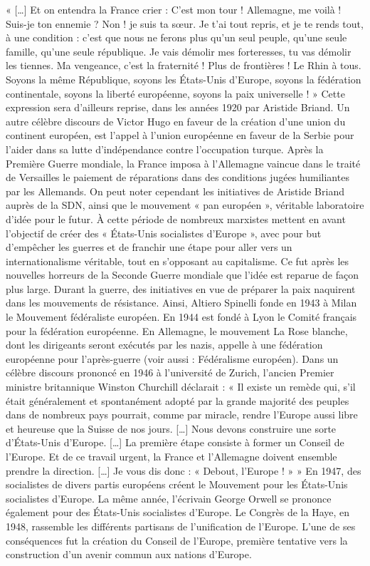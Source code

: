 \documentclass{report}%
\begin{document}
« […] Et on entendra la France crier : C'est mon tour ! Allemagne, me voilà ! Suis-je ton ennemie ? Non ! je suis ta sœur. Je t'ai tout repris, et je te rends tout, à une condition : c'est que nous ne ferons plus qu'un seul peuple, qu'une seule famille, qu'une seule république. Je vais démolir mes forteresses, tu vas démolir les tiennes. Ma vengeance, c'est la fraternité ! Plus de frontières ! Le Rhin à tous. Soyons la même République, soyons les États-Unis d'Europe, soyons la fédération continentale, soyons la liberté européenne, soyons la paix universelle ! »
Cette expression sera d'ailleurs reprise, dans les années 1920 par Aristide Briand. Un autre célèbre discours de Victor Hugo en faveur de la création d'une union du continent européen, est l'appel à l'union européenne en faveur de la Serbie pour l'aider dans sa lutte d'indépendance contre l'occupation turque.
Après la Première Guerre mondiale, la France imposa à l'Allemagne vaincue dans le traité de Versailles le paiement de réparations dans des conditions jugées humiliantes par les Allemands. On peut noter cependant les initiatives de Aristide Briand auprès de la SDN, ainsi que le mouvement « pan européen », véritable laboratoire d'idée pour le futur.
À cette période de nombreux marxistes mettent en avant l’objectif de créer des « États-Unis socialistes d’Europe », avec pour but d’empêcher les guerres et de franchir une étape pour aller vers un internationalisme véritable, tout en s’opposant au capitalisme.
Ce fut après les nouvelles horreurs de la Seconde Guerre mondiale que l'idée est reparue de façon plus large. Durant la guerre, des initiatives en vue de préparer la paix naquirent dans les mouvements de résistance. Ainsi, Altiero Spinelli fonde en 1943 à Milan le Mouvement fédéraliste européen. En 1944 est fondé à Lyon le Comité français pour la fédération européenne. En Allemagne, le mouvement La Rose blanche, dont les dirigeants seront exécutés par les nazis, appelle à une fédération européenne pour l'après-guerre (voir aussi : Fédéralisme européen).
Dans un célèbre discours prononcé en 1946 à l'université de Zurich, l'ancien Premier ministre britannique Winston Churchill déclarait :
« Il existe un remède qui, s'il était généralement et spontanément adopté par la grande majorité des peuples dans de nombreux pays pourrait, comme par miracle, rendre l'Europe aussi libre et heureuse que la Suisse de nos jours. […] Nous devons construire une sorte d'États-Unis d'Europe. […] La première étape consiste à former un Conseil de l'Europe. Et de ce travail urgent, la France et l'Allemagne doivent ensemble prendre la direction. […] Je vous dis donc : « Debout, l'Europe ! » »
En 1947, des socialistes de divers partis européens créent le Mouvement pour les États-Unis socialistes d’Europe. La même année, l’écrivain George Orwell se prononce également pour des États-Unis socialistes d’Europe.
Le Congrès de la Haye, en 1948, rassemble les différents partisans de l'unification de l'Europe. L'une de ses conséquences fut la création du Conseil de l'Europe, première tentative vers la construction d'un avenir commun aux nations d'Europe.
\end{document}
